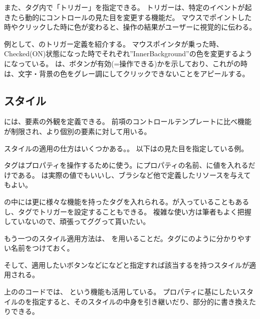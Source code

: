 \documentclass[letterpaper,10pt,dvipdfmx]{sphinxmanual}
\begin{document}
また、タグ内で「トリガー」を指定できる。
トリガーは、特定のイベントが起きたら動的にコントロールの見た目を変更する機能だ。
マウスでポイントした時やクリックした時に色が変わると、操作の結果がユーザーに視覚的に伝わる。

例として、のトリガー定義を紹介する。
マウスポインタが乗った時、Checked(ON)状態になった時でそれぞれ''InnerBackground''の色を変更するようになっている。
は、ボタンが有効(=操作できる)かを示しており、これがの時は、文字・背景の色をグレー調にしてクリックできないことをアピールする。


\subsection{スタイル}
\label{\detokenize{nissyu-idohen/pc-software-code:id5}}
 には、要素の外観を定義できる。
前項のコントロールテンプレートに比べ機能が制限され、より個別の要素に対して用いる。

スタイルの適用の仕方はいくつかある。。
以下はの見た目を指定している例。

タグはプロパティを操作するために使う。にプロパティの名前、に値を入れるだけである。
は実際の値でもいいし、ブラシなど他で定義したリソースを与えてもよい。

の中には更に様々な機能を持ったタグを入れられる。が入っていることもあるし、タグでトリガーを設定することもできる。
複雑な使い方は筆者もよく把握していないので、頑張ってググって貰いたい。

もう一つのスタイル適用方法は、
を用いることだ。タグにのように分かりやすい名前をつけておく。

そして、適用したいボタンなどになどと指定すれば該当するを持つスタイルが適用される。

上ののコードでは、
という機能も活用している。
プロパティに基にしたいスタイルのを指定すると、そのスタイルの中身を引き継いだり、部分的に書き換えたりできる。
\end{document}
